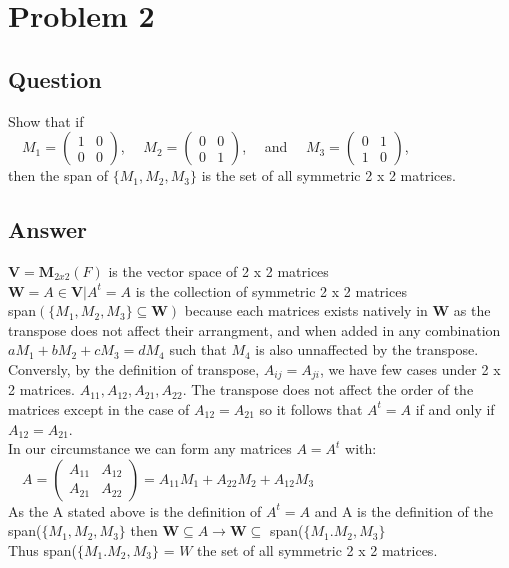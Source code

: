 \documentclass{article}
\begin{document}
\section*{Problem 2}
\subsection*{Question}
Show that if \\ \hspace*{.5cm} \(\quad M_{1} = \begin{pmatrix} 
1 & 0 \\
0 & 0 \end{pmatrix} \), 
 \(\quad M_{2} = \begin{pmatrix} 
0 & 0 \\
0 & 1 \end{pmatrix} \),\(\quad\) and
 \(\quad M_{3} = \begin{pmatrix} 
0 & 1 \\
1 & 0 \end{pmatrix} \), 
\\ then the span of \(\{M_{1}, M_{2}, M_{3}\}\) is the set of all symmetric 2 x 2 matrices.
\subsection*{Answer}
\(\textbf{V} = \textbf{M}_{2x2}(F)\) is the vector space of 2 x 2 matrices
\\ \(\textbf{W} = {A \in \textbf{V} | A^{t} = A}\) is the collection of symmetric 2 x 2 matrices
\\ span\((\{M_{1}, M_{2}, M_{3}\} \subseteq \textbf{W})\) because each matrices exists natively in \(\textbf{W}\) as the transpose does not affect their arrangment, and when added in any combination \(aM_{1} + bM_{2} + cM_{3} = dM_{4}\) such that \(M_{4}\) is also unnaffected by the transpose. 
\\ Conversly, by the definition of transpose, \(A_{ij} = A_{ji}\), we have few cases under 2 x 2 matrices. \(A_{11}, A_{12}, A_{21}, A_{22}\). The transpose does not affect the order of the matrices except in the case of \(A_{12} = A_{21}\) so it follows that \(A^{t} = A\) if and only if \(A_{12} = A_{21}\). 
\\ In our circumstance we can form any matrices \(A = A^{t}\) with:
\\\hspace*{.5cm} \(\quad A = \begin{pmatrix}
A_{11} & A_{12} \\
A_{21} & A_{22} \end{pmatrix} = A_{11}M_{1} + A_{22}M_{2} + A_{12}M_{3} \)
\\ As the A stated above is the definition of \(A^{t} = A\) and A is the definition of the span(\(\{M_{1}, M_{2}, M_{3}\}\) then \(\textbf{W} \subseteq A \rightarrow \textbf{W} \subseteq \) span(\(\{M_{1}. M_{2}, M_{3}\}\)
\\Thus span(\(\{M_{1}. M_{2}, M_{3}\}\) = \(W\) the set of all symmetric 2 x 2 matrices. 
\end{document}
